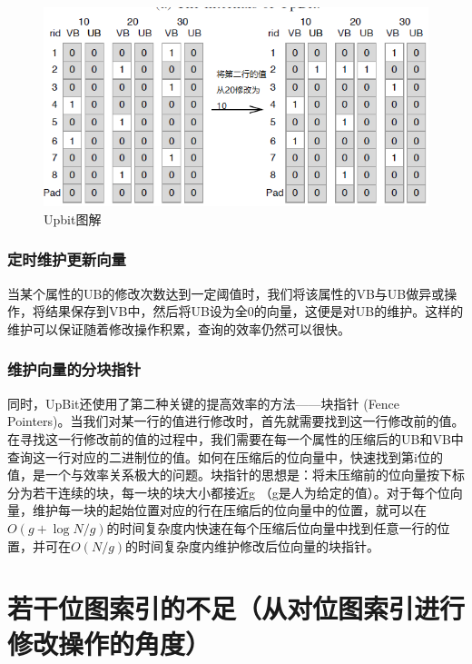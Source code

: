\documentclass[11pt, a4paper]{article}
\begin{document}
  \begin{figure}[H]
    \begin{center}
      \includegraphics[width=5.5in]{upbit.png}
      \caption{Upbit图解}\label{fig:upbit}
    \end{center}
  \end{figure}

  \subsubsection{定时维护更新向量}

  当某个属性的UB的修改次数达到一定阈值时，我们将该属性的VB与UB做异或操作，将结果保存到VB中，然后将UB设为全0的向量，这便是对UB的维护。这样的维护可以保证随着修改操作积累，查询的效率仍然可以很快。

  \subsubsection{维护向量的分块指针}

  同时，UpBit还使用了第二种关键的提高效率的方法——块指针 (Fence Pointers)。当我们对某一行的值进行修改时，首先就需要找到这一行修改前的值。在寻找这一行修改前的值的过程中，我们需要在每一个属性的压缩后的UB和VB中查询这一行对应的二进制位的值。如何在压缩后的位向量中，快速找到第i位的值，是一个与效率关系极大的问题。块指针的思想是：将未压缩前的位向量按下标分为若干连续的块，每一块的块大小都接近g （g是人为给定的值）。对于每个位向量，维护每一块的起始位置对应的行在压缩后的位向量中的位置，就可以在$O(g+\log N/g)$的时间复杂度内快速在每个压缩后位向量中找到任意一行的位置，并可在$O(N/g)$的时间复杂度内维护修改后位向量的块指针。

  \section{若干位图索引的不足（从对位图索引进行修改操作的角度）}
\end{document}
